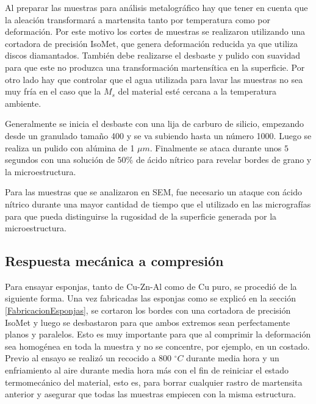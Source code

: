 \documentclass[a4paper,12pt,fleqn,twoside,openany]{book}
\begin{document}
Al preparar las muestras para análisis metalográfico hay que tener en cuenta que la aleación transformará a martensita tanto por temperatura como por deformación. Por este motivo los cortes de muestras se realizaron utilizando una cortadora de precisión IsoMet, que genera deformación reducida ya que utiliza discos diamantados. También debe realizarse el desbaste y pulido con suavidad para que este no produzca una transformación 
martensítica en la superficie. Por otro lado hay que controlar que el agua utilizada para lavar las muestras no sea muy fría en el caso 
que la $M_s$ del material esté cercana a la temperatura ambiente. 

Generalmente se inicia el desbaste con una lija de carburo de silicio, empezando desde un granulado tamaño 400 y se va subiendo hasta un número 1000. 
Luego se realiza un pulido con alúmina de 1 $\mu m$. Finalmente se ataca durante unos $5$ segundos con una solución de $50 \% $ de ácido nítrico para revelar bordes de grano y la microestructura. 

Para las muestras que se analizaron en SEM, fue necesario un ataque con ácido nítrico durante una mayor cantidad de tiempo que el utilizado en las micrografías para que pueda distinguirse la rugosidad de la superficie generada por la microestructura.

\subsection{Respuesta mecánica a compresión} \label{compresión}



Para ensayar esponjas, tanto de Cu-Zn-Al como de Cu puro, se procedió de la siguiente forma. Una vez fabricadas las esponjas como se explicó en la sección  \ref{FabricacionEsponjas}, se cortaron los bordes con una cortadora de precisión IsoMet y luego se desbastaron para que ambos extremos sean perfectamente planos y paralelos. Esto es muy importante para que al comprimir la deformación sea homogénea en toda la muestra y no se concentre, por ejemplo, en un costado. Previo al ensayo se realizó un recocido a 800 $^\circ C$ durante media hora y un enfriamiento al aire durante media hora más con el fin de reiniciar el estado termomecánico del material, esto es, para borrar cualquier rastro de martensita anterior y asegurar que todas las muestras empiecen con la misma estructura. 
\end{document}
